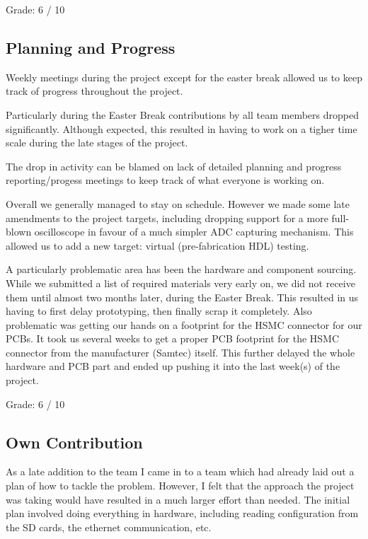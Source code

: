 \documentclass[a4paper,10pt]{article}
\begin{document}
Grade: 6 / 10



\subsection{Planning and Progress}
Weekly meetings during the project except for the easter break allowed us to keep
track of progress throughout the project.

Particularly during the Easter Break contributions by all team members
dropped significantly. Although expected, this resulted in having to work on
a tigher time scale during the late stages of the project.

The drop in activity can be blamed on lack of detailed planning and progress
reporting/progess meetings to keep track of what everyone is working on.

Overall we generally managed to stay on schedule. However we made some late
amendments to the project targets, including dropping support for a more full-blown
oscilloscope in favour of a much simpler ADC capturing mechanism. This allowed
us to add a new target: virtual (pre-fabrication HDL) testing.

A particularly problematic area has been the hardware and component sourcing. While
we submitted a list of required materials very early on, we did not receive them
until almost two months later, during the Easter Break. This resulted in us having
to first delay prototyping, then finally scrap it completely. Also problematic
was getting our hands on a footprint for the HSMC connector for our PCBs. It took
us several weeks to get a proper PCB footprint for the HSMC connector from the manufacturer (Samtec)
itself. This further delayed the whole hardware and PCB part and ended up pushing
it into the last week(s) of the project.

Grade: 6 / 10



\subsection{Own Contribution}
As a late addition to the team I came in to a team which had already laid
out a plan of how to tackle the problem. However, I felt that the approach
the project was taking would have resulted in a much larger effort than needed.
The initial plan involved doing everything in hardware, including reading configuration
from the SD cards, the ethernet communication, etc.
\end{document}
